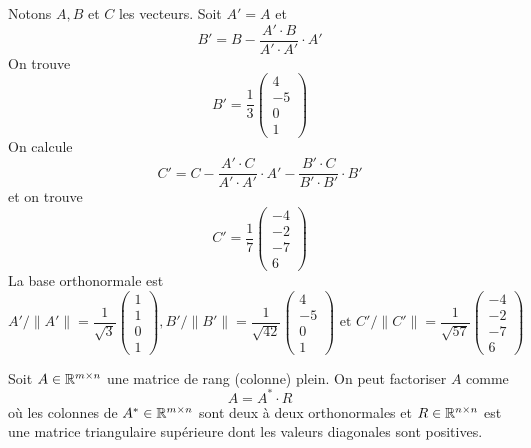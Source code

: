 \begin{example}
Notons $A,B$ et $C$ les vecteurs. Soit $A'=A$ et 
\begin{displaymath}
  B' = B - \frac{A'\cdot B}{A'\cdot A'} \cdot A'
\end{displaymath}
On trouve 
\begin{displaymath}
  B' = \frac{1}{3}
  \begin{pmatrix}
    4\\-5\\0\\1
  \end{pmatrix}
\end{displaymath}
On calcule 
\begin{displaymath}
  C' = C - \frac{A'\cdot C}{A'\cdot A'} \cdot A' - \frac{B'\cdot C}{B'\cdot B'} \cdot B'
\end{displaymath}
et on trouve 
\begin{displaymath}
  C' = \frac{1}{7}
  \begin{pmatrix}
    -4\\-2\\-7\\6
  \end{pmatrix}  
\end{displaymath}
La base orthonormale est
\begin{displaymath}
  A' / \|A'\| = \frac{1}{\sqrt{3}}
  \begin{pmatrix}
    1\\1\\0\\1
  \end{pmatrix},
    B'/ \|B'\| = \frac{1}{\sqrt{42}}
  \begin{pmatrix}
    4\\-5\\0\\1
  \end{pmatrix}
\text{ et }
C'/ \|C'\| = \frac{1}{\sqrt{57}}
  \begin{pmatrix}
    -4\\-2\\-7\\6
  \end{pmatrix}  
\end{displaymath}
\end{example}

\begin{corollary}
  \label{co:2}
  Soit $A \in \mathbb{R}^{m\times n}$ une matrice de rang (colonne) plein. On peut factoriser $A$ comme 
  \begin{displaymath}
    A = A^* \cdot R
  \end{displaymath}
où les colonnes de  $A^* \in \mathbb{R}^{m\times n}$ sont deux à deux orthonormales et $R \in \mathbb{R}^{n \times n}$ est une matrice triangulaire supérieure dont les valeurs diagonales sont positives. 
\end{corollary}

